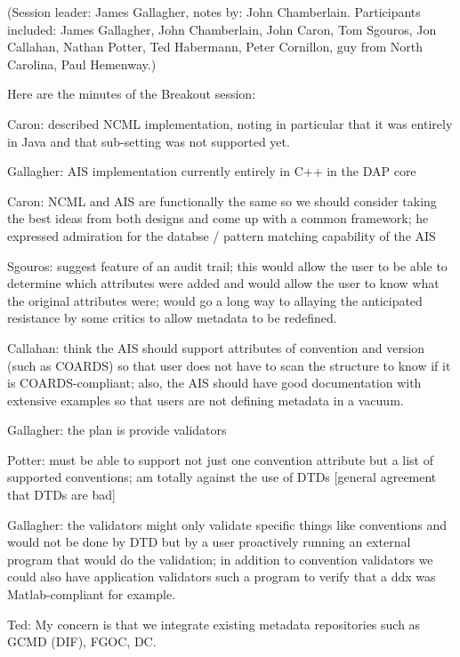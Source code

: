 %
%
%
%

(Session leader: James Gallagher, notes by: John Chamberlain.
Participants included: James Gallagher, John Chamberlain, John Caron,
Tom Sgouros, Jon Callahan, Nathan Potter, Ted Habermann, Peter
Cornillon, guy from North Carolina, Paul Hemenway.)

Here are the minutes of the Breakout session:

Caron: described NCML implementation, noting in particular that it was
entirely in Java and that sub-setting was not supported yet.

Gallagher: AIS implementation currently entirely in C++ in the DAP core

Caron: NCML and AIS are functionally the same so we should consider
taking the best ideas from both designs and come up with a common
framework; he expressed admiration for the databse / pattern matching
capability of the AIS

Sgouros: suggest feature of an audit trail; this would allow the user
to be able to determine which attributes were added and would allow
the user to know what the original attributes were; would go a long
way to allaying the anticipated resistance by some critics to allow
metadata to be redefined.

Callahan: think the AIS should support attributes of convention and
version (such as COARDS) so that user does not have to scan the
structure to know if it is COARDS-compliant; also, the AIS should have
good documentation with extensive examples so that users are not
defining metadata in a vacuum.

Gallagher: the plan is provide validators

Potter: must be able to support not just one convention attribute but a
list of supported conventions; am totally against the use of DTDs
[general agreement that DTDs are bad]

Gallagher: the validators might only validate specific things like
conventions and would not be done by DTD but by a user proactively
running an external program that would do the validation; in addition to
convention validators we could also have application validators such a
program to verify that a ddx was Matlab-compliant for example.

Ted:  My concern is that we integrate existing metadata repositories
such as GCMD (DIF), FGOC, DC.


